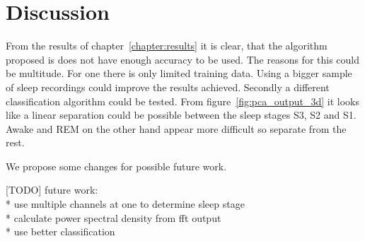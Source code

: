 \chapter{Discussion}
\label{chapter:discussion}

From the results of chapter~\ref{chapter:results} it is clear, that the algorithm proposed is does not have enough accuracy to be used. The reasons for this could be multitude. For one there is only limited training data. Using a bigger sample of sleep recordings could improve the results achieved. Secondly a different classification algorithm could be tested. From figure~\ref{fig:pca_output_3d} it looks like a linear separation could be possible between the sleep stages S3, S2 and S1. Awake and REM on the other hand appear more difficult so separate from the rest.

We propose some changes for possible future work. 

[TODO]
\newline
\newline
future work:\\
* use multiple channels at one to determine sleep stage\\
* calculate power spectral density from fft output\\
* use better classification